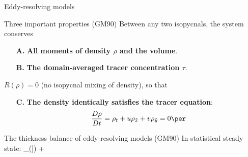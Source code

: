 \documentclass{beamer}
\begin{document}
\begin{frame}{Eddy-resolving models}
\vspace{-.125cm}
\begin{exampleblock}{Three important properties (GM90)}
Between any two isopycnals, the system conserves

\begin{enumerate}
\item [\bf A.] {\bf All moments of density $\rho$ and the volume}.
\item [\bf B.] {\bf The domain-averaged tracer concentration $\tau$}.
\end{enumerate}

$R(\rho) = 0$ (no isopycnal mixing of density), so that

\begin{enumerate}
\item [\bf C.] {\bf The density identically satisfies the tracer equation}:
\vspace{-.275cm}
 $$\frac{D \rho}{D t} = \rho_t + u\rho_{\tilde x} + v\rho_{\tilde y}= 0\per$$
\end{enumerate}

\end{exampleblock}


\begin{block}{The thickness balance of eddy-resolving models (GM90)}
In statistical steady state:
\vspace{-.2cm}
\beq{}
\nabla_{\!\!\rho}\cdot \left(\bar{}\right)
 +  \com
\eeq
\end{block}

\end{frame}
\end{document}
